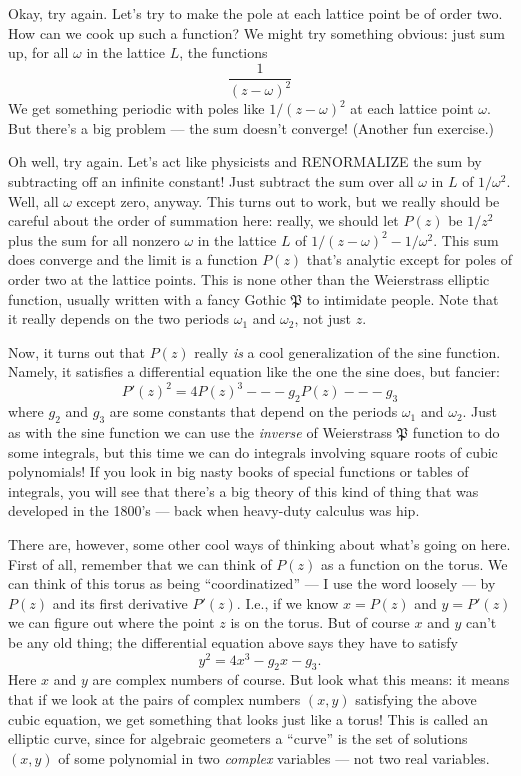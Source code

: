 \documentclass{article}
\begin{document}
Okay, try again. Let's try to make the pole at each lattice point be of
order two. How can we cook up such a function? We might try something
obvious: just sum up, for all \(\omega\) in the lattice \(L\), the
functions \[\frac{1}{(z -\omega)^2}\] We get something periodic with
poles like \(1/(z -\omega)^2\) at each lattice point \(\omega\). But
there's a big problem --- the sum doesn't converge! (Another fun
exercise.)

Oh well, try again. Let's act like physicists and RENORMALIZE the sum by
subtracting off an infinite constant! Just subtract the sum over all
\(\omega\) in \(L\) of \(1/\omega^2\). Well, all \(\omega\) except zero,
anyway. This turns out to work, but we really should be careful about
the order of summation here: really, we should let \(P(z)\) be \(1/z^2\)
plus the sum for all nonzero \(\omega\) in the lattice \(L\) of
\(1/(z -\omega)^2 -1/\omega^2\). This sum does converge and the limit is
a function \(P(z)\) that's analytic except for poles of order two at the
lattice points. This is none other than the Weierstrass elliptic
function, usually written with a fancy Gothic \(\mathfrak{P}\) to
intimidate people. Note that it really depends on the two periods
\(\omega_1\) and \(\omega_2\), not just \(z\).

Now, it turns out that \(P(z)\) really \emph{is} a cool generalization
of the sine function. Namely, it satisfies a differential equation like
the one the sine does, but fancier:
\[P'(z)^2 = 4 P(z)^3 --- g_2 P(z) --- g_3\] where \(g_2\) and \(g_3\)
are some constants that depend on the periods \(\omega_1\) and
\(\omega_2\). Just as with the sine function we can use the
\emph{inverse} of Weierstrass \(\mathfrak{P}\) function to do some
integrals, but this time we can do integrals involving square roots of
cubic polynomials! If you look in big nasty books of special functions
or tables of integrals, you will see that there's a big theory of this
kind of thing that was developed in the 1800's --- back when heavy-duty
calculus was hip.

There are, however, some other cool ways of thinking about what's going
on here. First of all, remember that we can think of \(P(z)\) as a
function on the torus. We can think of this torus as being
``coordinatized'' --- I use the word loosely --- by \(P(z)\) and its
first derivative \(P'(z)\). I.e., if we know \(x = P(z)\) and
\(y = P'(z)\) we can figure out where the point \(z\) is on the torus.
But of course \(x\) and \(y\) can't be any old thing; the differential
equation above says they have to satisfy \[y^2 = 4x^3 -g_2 x -g_3.\]
Here \(x\) and \(y\) are complex numbers of course. But look what this
means: it means that if we look at the pairs of complex numbers
\((x,y)\) satisfying the above cubic equation, we get something that
looks just like a torus! This is called an elliptic curve, since for
algebraic geometers a ``curve'' is the set of solutions \((x,y)\) of
some polynomial in two \emph{complex} variables --- not two real
variables.
\end{document}
